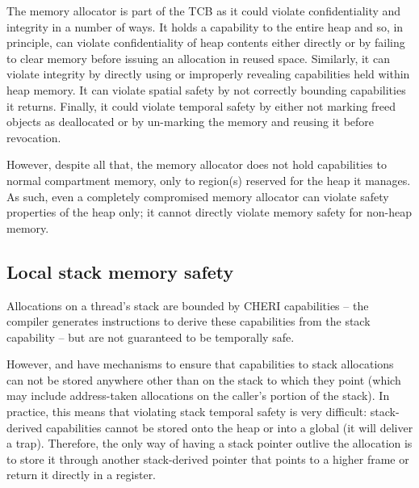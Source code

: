 The memory allocator is part of the TCB as it could violate confidentiality and integrity in a number of ways.
It holds a capability to the entire heap and so, in principle, can violate confidentiality of heap contents either directly or by failing to clear memory before issuing an allocation in reused space.
Similarly, it can violate integrity by directly using or improperly revealing capabilities held within heap memory.
It can violate spatial safety by not correctly bounding capabilities it returns.
Finally, it could violate temporal safety by either not marking freed objects as deallocated or by un-marking the memory and reusing it before revocation.

However, despite all that, the memory allocator does not hold capabilities to normal compartment memory, only to region(s) reserved for the heap it manages.
As such, even a completely compromised memory allocator can violate safety properties of the heap only; it cannot directly violate memory safety for non-heap memory.

\subsection{Local stack memory safety}

Allocations on a thread's stack are bounded by CHERI capabilities -- the compiler generates instructions to derive these capabilities from the stack capability -- but are not guaranteed to be temporally safe.

However, \cherimcuisa{} and \cherimcuos{} have mechanisms to ensure that capabilities to stack allocations can not be stored anywhere other than on the stack to which they point (which may include address-taken allocations on the caller's portion of the stack).
In practice, this means that violating stack temporal safety is very difficult: stack-derived capabilities cannot be stored onto the heap or into a global (it will deliver a trap).
Therefore, the only way of having a stack pointer outlive the allocation is to store it through another stack-derived pointer that points to a higher frame or return it directly in a register.


